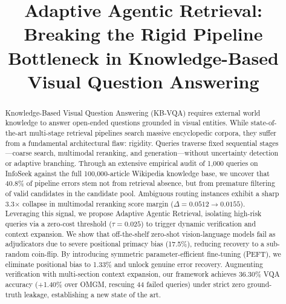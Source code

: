 \documentclass[conference]{IEEEtran}
\begin{document}
\title{Adaptive Agentic Retrieval: Breaking the Rigid Pipeline Bottleneck in Knowledge-Based Visual Question Answering}

\author{
\and
{}
}

\maketitle
\thispagestyle{plain}

\begin{abstract}
Knowledge-Based Visual Question Answering (KB-VQA) requires external world knowledge to answer open-ended questions grounded in visual entities. While state-of-the-art multi-stage retrieval pipelines search massive encyclopedic corpora, they suffer from a fundamental architectural flaw: rigidity. Queries traverse fixed sequential stages---coarse search, multimodal reranking, and generation---without uncertainty detection or adaptive branching. Through an extensive empirical audit of 1,000 queries on InfoSeek against the full 100,000-article Wikipedia knowledge base, we uncover that 40.8\% of pipeline errors stem not from retrieval absence, but from premature filtering of valid candidates in the candidate pool. Ambiguous routing instances exhibit a sharp 3.3$\times$ collapse in multimodal reranking score margin ($\Delta = 0.0512 \to 0.0155$). Leveraging this signal, we propose Adaptive Agentic Retrieval, isolating high-risk queries via a zero-cost threshold ($\tau = 0.025$) to trigger dynamic verification and context expansion. We show that off-the-shelf zero-shot vision-language models fail as adjudicators due to severe positional primacy bias (17.5\%), reducing recovery to a sub-random coin-flip. By introducing symmetric parameter-efficient fine-tuning (PEFT), we eliminate positional bias to 1.33\% and unlock genuine error recovery. Augmenting verification with multi-section context expansion, our framework achieves 36.30\% VQA accuracy (+1.40\% over OMGM, rescuing 44 failed queries) under strict zero ground-truth leakage, establishing a new state of the art.
\end{abstract}
\end{document}
